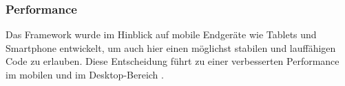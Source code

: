 \subsubsection{Performance}

Das Framework wurde im Hinblick auf mobile Endgeräte wie Tablets und Smartphone entwickelt, um auch hier einen möglichst stabilen und lauffähigen Code zu erlauben. Diese Entscheidung führt zu einer verbesserten Performance im mobilen und im Desktop-Bereich \cite[S. 14]{Rangle.io2016}.